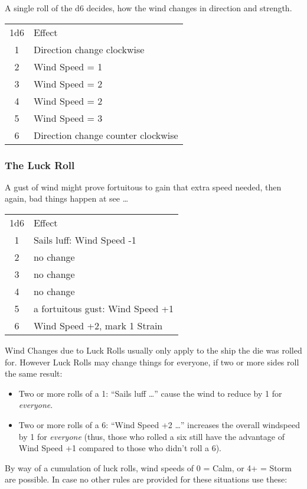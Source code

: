 \documentclass[11pt]{wbzine}
\begin{document}
\begin{multicols}{2}
A single roll of the d6 decides, how the wind changes in direction and
strength.

\begin{tabularx}{\columnwidth}{cZ}
1d6 & Effect \\
1 & Direction change clockwise \\
2 & Wind Speed = 1 \\
3 & Wind Speed = 2 \\
4 & Wind Speed = 2 \\
5 & Wind Speed = 3 \\
6 & Direction change counter clockwise \\
\end{tabularx}

\subsubsection{The Luck Roll}

A gust of wind might prove fortuitous to gain that extra speed needed,
then again, bad things happen at see \ldots{}

\begin{tabularx}{\columnwidth}{cZ}
1d6 & Effect \\
1 & Sails luff: Wind Speed -1 \\
2 & no change \\
3 & no change \\
4 & no change \\
5 & a fortuitous gust: Wind Speed +1 \\
6 & Wind Speed +2, mark 1 Strain \\
\end{tabularx}

Wind Changes due to Luck Rolls usually only apply to the ship the die
was rolled for. However Luck Rolls may change things for everyone, if
two or more sides roll the same result:

\begin{itemize}
\item
  Two or more rolls of a 1: ``Sails luff \ldots{}'' cause the wind to
  reduce by 1 for \emph{everyone}.
\item
  Two or more rolls of a 6: ``Wind Speed +2 \ldots{}'' increases the
  overall windspeed by 1 for \emph{everyone} (thus, those who rolled a
  six still have the advantage of Wind Speed +1 compared to those who
  didn't roll a 6).
\end{itemize}

By way of a cumulation of luck rolls, wind speeds of 0 = Calm, or 4+ =
Storm are possible. In case no other rules are provided for these
situations use these:


\end{multicols}
\end{document}
